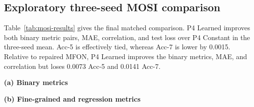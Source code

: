 \subsection{Exploratory three-seed MOSI
comparison}\label{exploratory-three-seed-mosi-comparison}

Table~\ref{tab:mosi-results} gives the final matched comparison. P4 Learned improves both
binary metric pairs, MAE, correlation, and test loss over P4 Constant in
the three-seed mean. Acc-5 is effectively tied, whereas Acc-7 is lower
by 0.0015. Relative to repaired MFON, P4 Learned improves the binary
metrics, MAE, and correlation but loses 0.0073 Acc-5 and 0.0141 Acc-7.

\begin{table}[t]
\caption{Clean CMU-MOSI performance (mean $\pm$ sample standard deviation
over seeds 1111, 1112, and 1113). Bold marks the better value between the
two equal-budget P4 variants; tied Acc-5 values are both bold.}
\label{tab:mosi-results}
\centering
\small
\textbf{(a) Binary metrics}\par\smallskip
{}

\vspace{0.7em}
\textbf{(b) Fine-grained and regression metrics}\par\smallskip
{}
\end{table}

